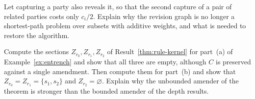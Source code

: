 \begin{exercise}
Let capturing a party also reveals it, so that the second capture of a pair of related parties costs only $c_i/2$. Explain why the revision graph is no longer a shortest-path problem over subsets with additive weights, and what is needed to restore the algorithm.
\end{exercise}

\begin{exercise}
Compute the sections $Z_{r_0},Z_{r_1},Z_{r_2}$ of Result~\ref{thm:rule-kernel} for part~(a) of Example~\ref{ex:entrench} and show that all three are empty, although $C$ is preserved against a single amendment. Then compute them for part~(b) and show that $Z_{r_0}=Z_{r_1}=\{s_1,s_2\}$ and $Z_{r_2}=\varnothing$. Explain why the unbounded amender of the theorem is stronger than the bounded amender of the depth results.
\end{exercise}

